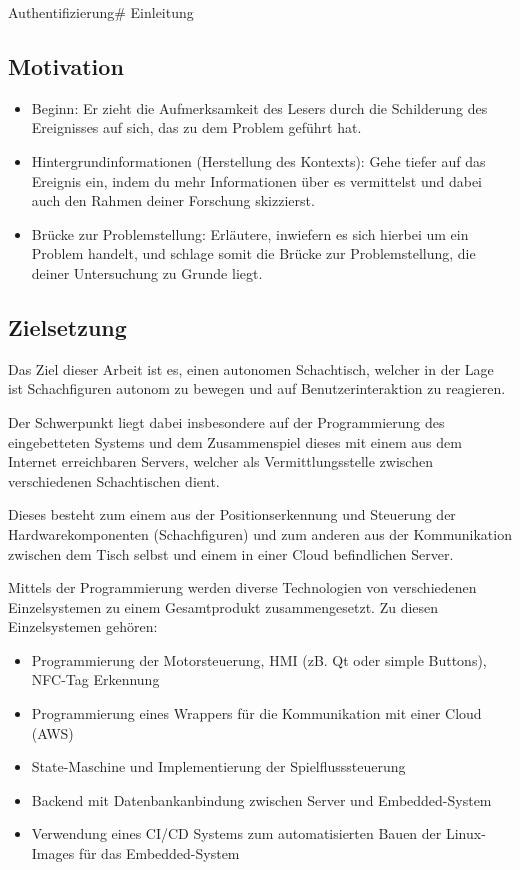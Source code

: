 Authentifizierung\# Einleitung

\hypertarget{motivation}{%
\subsection{Motivation}\label{motivation}}

\begin{itemize}
\tightlist
\item
  Beginn: Er zieht die Aufmerksamkeit des Lesers durch die Schilderung
  des Ereignisses auf sich, das zu dem Problem geführt hat.
\item
  Hintergrundinformationen (Herstellung des Kontexts): Gehe tiefer auf
  das Ereignis ein, indem du mehr Informationen über es vermittelst und
  dabei auch den Rahmen deiner Forschung skizzierst.
\item
  Brücke zur Problemstellung: Erläutere, inwiefern es sich hierbei um
  ein Problem handelt, und schlage somit die Brücke zur Problemstellung,
  die deiner Untersuchung zu Grunde liegt.
\end{itemize}

\hypertarget{zielsetzung}{%
\subsection{Zielsetzung}\label{zielsetzung}}

Das Ziel dieser Arbeit ist es, einen autonomen Schachtisch, welcher in
der Lage ist Schachfiguren autonom zu bewegen und auf
Benutzerinteraktion zu reagieren.

Der Schwerpunkt liegt dabei insbesondere auf der Programmierung des
eingebetteten Systems und dem Zusammenspiel dieses mit einem aus dem
Internet erreichbaren Servers, welcher als Vermittlungsstelle zwischen
verschiedenen Schachtischen dient.

Dieses besteht zum einem aus der Positionserkennung und Steuerung der
Hardwarekomponenten (Schachfiguren) und zum anderen aus der
Kommunikation zwischen dem Tisch selbst und einem in einer Cloud
befindlichen Server.

Mittels der Programmierung werden diverse Technologien von verschiedenen
Einzelsystemen zu einem Gesamtprodukt zusammengesetzt. Zu diesen
Einzelsystemen gehören:

\begin{itemize}
\tightlist
\item
  Programmierung der Motorsteuerung, HMI (zB. Qt oder simple Buttons),
  NFC-Tag Erkennung
\item
  Programmierung eines Wrappers für die Kommunikation mit einer Cloud
  (AWS)
\item
  State-Maschine und Implementierung der Spielflusssteuerung
\item
  Backend mit Datenbankanbindung zwischen Server und Embedded-System
\item
  Verwendung eines CI/CD Systems zum automatisierten Bauen der
  Linux-Images für das Embedded-System
\end{itemize}

